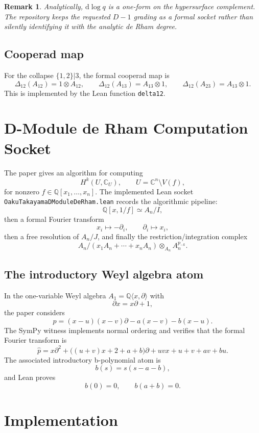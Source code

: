 \documentclass[11pt]{article}
\newtheorem{remark}{Remark}
\newcommand{\C}{\mathbb{C}}
\newcommand{\Q}{\mathbb{Q}}
\begin{document}
\begin{remark}
Analytically, \(\mathrm{d}\log q\) is a one-form on the hypersurface
complement.  The repository keeps the requested \(D-1\) grading as a formal
socket rather than silently identifying it with the analytic de Rham degree.
\end{remark}

\subsection{Cooperad map}

For the collapse \(\{1,2\}|3\), the formal cooperad map is
\[
  \Delta_{12}(A_{12})=1\otimes A_{12},\qquad
  \Delta_{12}(A_{13})=A_{13}\otimes 1,\qquad
  \Delta_{12}(A_{23})=A_{13}\otimes 1.
\]
This is implemented by the Lean function \texttt{delta12}.

\section{D-Module de Rham Computation Socket}

The paper \cite{OakuTakayama1998} gives an algorithm for computing
\[
  H^k(U,\C_U),\qquad U=\C^n\setminus V(f),
\]
for nonzero \(f\in\Q[x_1,\ldots,x_n]\).  The implemented Lean socket
\texttt{OakuTakayamaDModuleDeRham.lean} records the algorithmic pipeline:
\[
  \Q[x,1/f]\simeq A_n/I,
\]
then a formal Fourier transform
\[
  x_i\mapsto -\partial_i,\qquad \partial_i\mapsto x_i,
\]
then a free resolution of \(A_n/J\), and finally the restriction/integration
complex
\[
  A_n/(x_1A_n+\cdots+x_nA_n)\otimes_{A_n} A_n^{p_{-k}}.
\]

\subsection{The introductory Weyl algebra atom}

In the one-variable Weyl algebra \(A_1=\Q\langle x,\partial\rangle\) with
\[
  \partial x=x\partial+1,
\]
the paper considers
\[
  p=(x-u)(x-v)\partial-a(x-v)-b(x-u).
\]
The SymPy witness implements normal ordering and verifies that the formal
Fourier transform is
\[
  \widehat p
  =
  x\partial^2
  +\bigl((u+v)x+2+a+b\bigr)\partial
  +uvx+u+v+av+bu.
\]
The associated introductory b-polynomial atom is
\[
  b(s)=s(s-a-b),
\]
and Lean proves
\[
  b(0)=0,\qquad b(a+b)=0.
\]

\section{Implementation}
\end{document}
